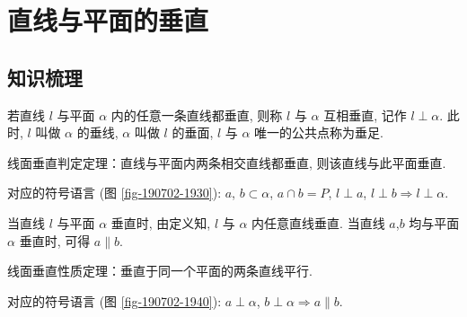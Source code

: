 
\section{直线与平面的垂直}

\subsection{知识梳理}

若直线 $l$ 与平面 $\alpha$ 内的任意一条直线都垂直, 则称 $l$ 与 $\alpha$ 互相垂直, 记作 $l\perp \alpha$. 此时, $l$ 叫做 $\alpha$ 的垂线, $\alpha$ 叫做 $l$ 的垂面, $l$ 与 $\alpha$ 唯一的公共点称为垂足.

线面垂直判定定理：直线与平面内两条相交直线都垂直, 则该直线与此平面垂直.

对应的符号语言 (图 \ref{fig-190702-1930}): $a$, $b\subset\alpha$, $a\cap b= P$, $l\perp a$, $l\perp b\Rightarrow l\perp \alpha$.

当直线 $l$ 与平面 $\alpha$ 垂直时, 由定义知, $l$ 与 $\alpha$ 内任意直线垂直. 当直线 $a$,$b$ 均与平面 $\alpha$ 垂直时, 可得 $a\parallel b$.

线面垂直性质定理：垂直于同一个平面的两条直线平行.

对应的符号语言 (图 \ref{fig-190702-1940}): $a\perp\alpha$, $b\perp\alpha\Rightarrow a\parallel b$.

